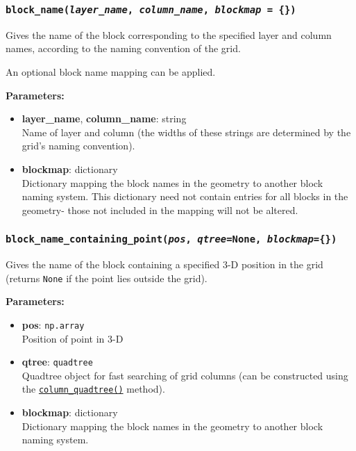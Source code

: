 \begin{snugshade}\subsubsection{\texttt{block\_name(\emph{layer\_name}, \emph{column\_name}, \emph{blockmap} = \{\})}}\end{snugshade}
\label{sec:mulgrid:block_name}

Gives the name of the block corresponding to the specified layer and column names, according to the naming convention of the grid.

An optional block name mapping can be applied.

\textbf{Parameters:}
\begin{itemize}
\item \textbf{layer\_name}, \textbf{column\_name}: string\\
  Name of layer and column (the widths of these strings are determined by the grid's naming convention).
\item \textbf{blockmap}: dictionary\\
  Dictionary mapping the block names in the geometry to another block naming system. This dictionary need not contain entries for all blocks in the geometry- those not included in the mapping will not be altered.
\end{itemize}

\begin{snugshade}\subsubsection{\texttt{block\_name\_containing\_point(\emph{pos}, \emph{qtree}=None, \emph{blockmap}=\{\})}}\end{snugshade}
\label{sec:mulgrid:block_name_containing_point}

Gives the name of the block containing a specified 3-D position in the grid (returns \texttt{None} if the point lies outside the grid).

\textbf{Parameters:}
\begin{itemize}
\item \textbf{pos}: \texttt{np.array}\\
  Position of point in 3-D
\item \textbf{qtree}: \texttt{quadtree}\\
  Quadtree object for fast searching of grid columns (can be constructed using the \hyperref[sec:mulgrid:column_quadtree]{\texttt{column\_quadtree()}} method).
\item \textbf{blockmap}: dictionary\\
  Dictionary mapping the block names in the geometry to another block naming system.
\end{itemize}

